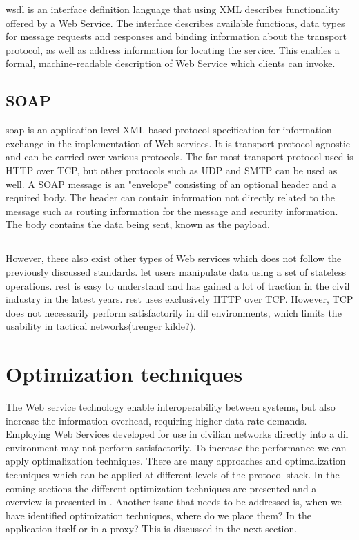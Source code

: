 \documentclass[USenglish]{ifimaster}
\begin{document}
\gls{wsdl} is an interface definition language that using XML describes
functionality offered by a Web Service. The interface describes available
functions, data types for message requests and responses and binding information
about the transport protocol, as well as address information for locating the
service. This enables a formal, machine-readable description of Web Service
which clients can invoke.


\subsection{SOAP}

\gls{soap} is an application level XML-based protocol specification for
information exchange in the implementation of Web services. It is transport
protocol agnostic and can be carried over various protocols. The far most
transport protocol used is HTTP over TCP, but other protocols such as UDP and
SMTP can be used as well. A SOAP message is an "envelope" consisting of an
optional header and a required body. The header can contain information not
directly related to the message such as routing information for the message and
security information. The body contains the data being sent, known as the
payload.

\subsection{}
\label{rest}
However, there also exist other types of Web services which does not follow the
previously discussed standards.  let users manipulate data
using a set of stateless operations. \gls{rest} is easy to understand and has
gained a lot of traction in the civil industry in the latest years. \gls{rest}
uses exclusively HTTP over TCP. However, TCP does not necessarily perform
satisfactorily in \gls{dil} environments, which limits the usability in tactical
networks(trenger kilde?).


\section{Optimization techniques}
The Web service technology enable interoperability between systems, but also
increase the information overhead, requiring higher data rate demands. Employing
Web Services developed for use in civilian networks directly into a \gls{dil}
environment may not perform satisfactorily. To increase the performance we can
apply optimalization techniques. There are many approaches and optimalization
techniques which can be applied at different levels of the protocol stack. In
the coming sections the different optimization techniques are presented and a
overview is presented in . Another issue
that needs to be addressed is, when we have identified optimization techniques,
where do we place them? In the application itself or in a proxy? This is
discussed in the next section.
\end{document}

